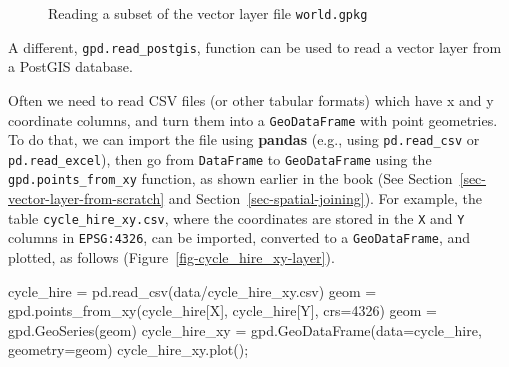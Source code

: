 \documentclass[
  letterpaper,
]{krantz}
\newenvironment{Shaded}{\begin{snugshade}}{\end{snugshade}}
\newcommand{\DecValTok}[1]{\textcolor[rgb]{0.68,0.00,0.00}{#1}}
\newcommand{\NormalTok}[1]{\textcolor[rgb]{0.00,0.23,0.31}{#1}}
\newcommand{\OperatorTok}[1]{\textcolor[rgb]{0.37,0.37,0.37}{#1}}
\newcommand{\StringTok}[1]{\textcolor[rgb]{0.13,0.47,0.30}{#1}}
\begin{document}
\begin{figure}

\begin{minipage}{0.50\linewidth}



\end{minipage}%
%
\begin{minipage}{0.50\linewidth}



\end{minipage}%

\caption{\label{fig-read-shp-query}Reading a subset of the vector layer
file \texttt{world.gpkg}}

\end{figure}%

A different, \texttt{gpd.read\_postgis}, function can be used to read a
vector layer from a PostGIS database.

Often we need to read CSV files (or other tabular formats) which have x
and y coordinate columns, and turn them into a \texttt{GeoDataFrame}
with point geometries. To do that, we can import the file using
\textbf{pandas} (e.g., using \texttt{pd.read\_csv} or
\texttt{pd.read\_excel}), then go from \texttt{DataFrame} to
\texttt{GeoDataFrame} using the \texttt{gpd.points\_from\_xy} function,
as shown earlier in the book (See
Section~\ref{sec-vector-layer-from-scratch} and
Section~\ref{sec-spatial-joining}). For example, the table
\texttt{cycle\_hire\_xy.csv}, where the coordinates are stored in the
\texttt{X} and \texttt{Y} columns in \texttt{EPSG:4326}, can be
imported, converted to a \texttt{GeoDataFrame}, and plotted, as follows
(Figure~\ref{fig-cycle_hire_xy-layer}).

\begin{Shaded}
\begin{Highlighting}[]
\NormalTok{cycle\_hire }\OperatorTok{=}\NormalTok{ pd.read\_csv(}\StringTok{\textquotesingle{}data/cycle\_hire\_xy.csv\textquotesingle{}}\NormalTok{)}
\NormalTok{geom }\OperatorTok{=}\NormalTok{ gpd.points\_from\_xy(cycle\_hire[}\StringTok{\textquotesingle{}X\textquotesingle{}}\NormalTok{], cycle\_hire[}\StringTok{\textquotesingle{}Y\textquotesingle{}}\NormalTok{], crs}\OperatorTok{=}\DecValTok{4326}\NormalTok{)}
\NormalTok{geom }\OperatorTok{=}\NormalTok{ gpd.GeoSeries(geom)}
\NormalTok{cycle\_hire\_xy }\OperatorTok{=}\NormalTok{ gpd.GeoDataFrame(data}\OperatorTok{=}\NormalTok{cycle\_hire, geometry}\OperatorTok{=}\NormalTok{geom)}
\NormalTok{cycle\_hire\_xy.plot()}\OperatorTok{;}
\end{Highlighting}
\end{Shaded}
\end{document}
